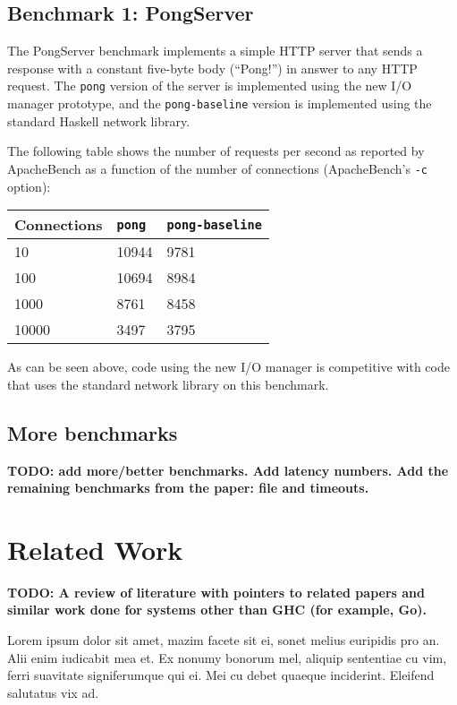 \documentclass[a4paper,11pt,oneside]{report}
\begin{document}
\section{Benchmark 1: PongServer}

The PongServer benchmark implements a simple HTTP server that sends a response
with a constant five-byte body (``Pong!'') in answer to any HTTP request. The
\texttt{pong} version of the server is implemented using the new I/O manager
prototype, and the \texttt{pong-baseline} version is implemented using the
standard Haskell network library.

The following table shows the number of requests per second as reported by
ApacheBench as a function of the number of connections (ApacheBench's
\texttt{-c} option):

\begin{center}
\begin{tabular}{ | l | l | l | }
  \hline
  Connections & \texttt{pong} & \texttt{pong-baseline} \\
  \hline
  10 & 10944 & 9781 \\
  \hline
  100 & 10694 & 8984 \\
  \hline
  1000 & 8761 & 8458 \\
  \hline
  10000 & 3497 & 3795 \\
  \hline
\end{tabular}
\end{center}

As can be seen above, code using the new I/O manager is competitive with code
that uses the standard network library on this benchmark.

\section{More benchmarks}

\textbf{TODO: add more/better benchmarks. Add latency numbers. Add the remaining
  benchmarks from the \cite{bib:o'sullivan} paper: file and timeouts.}


\chapter{Related Work}
\label{chap:related-work}

\textbf{TODO: A review of literature with pointers to related papers and similar
  work done for systems other than GHC (for example, Go). }

Lorem ipsum dolor sit amet, mazim facete sit ei, sonet melius euripidis pro
an. Alii enim iudicabit mea et. Ex nonumy bonorum mel, aliquip sententiae cu
vim, ferri suavitate signiferumque qui ei. Mei cu debet quaeque
inciderint. Eleifend salutatus vix ad.
\end{document}
